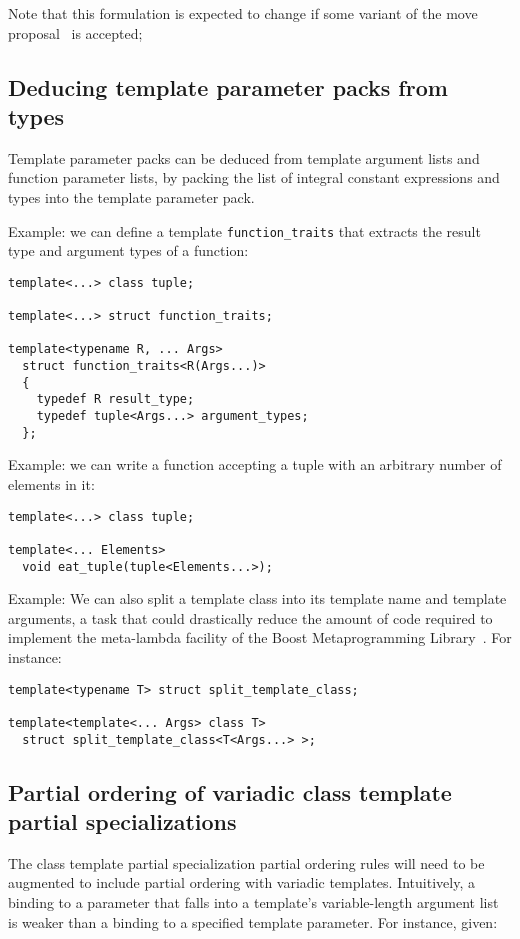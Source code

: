 \documentclass{article}
\begin{document}
Note that this formulation is expected to change if some variant of
the move proposal~\cite{Hinnant02} is accepted;

\subsection{Deducing template parameter packs from types}
Template parameter packs can be deduced from template argument lists
and function parameter lists, by packing the list of integral constant
expressions and types into the template parameter pack.

Example: we can define a template {\tt function\_traits} that extracts
the result type and argument types of a function:
\begin{verbatim}
template<...> class tuple;

template<...> struct function_traits;

template<typename R, ... Args> 
  struct function_traits<R(Args...)>
  { 
    typedef R result_type; 
    typedef tuple<Args...> argument_types;
  };
\end{verbatim}

Example: we can write a function accepting a tuple with an arbitrary
number of elements in it:
\begin{verbatim}
template<...> class tuple;

template<... Elements>
  void eat_tuple(tuple<Elements...>);
\end{verbatim}

Example: We can also split a template class into its template name and
template arguments, a task that could drastically reduce the amount of code required to implement the meta-lambda facility of the Boost Metaprogramming Library~\cite{Gurtovoy02}. For instance:

\begin{verbatim}
template<typename T> struct split_template_class;

template<template<... Args> class T> 
  struct split_template_class<T<Args...> >;
\end{verbatim}

\subsection{Partial ordering of variadic class template partial specializations}
The class template partial specialization partial ordering rules will
need to be augmented to include partial ordering with variadic
templates. Intuitively, a binding to a parameter that falls into a
template's variable-length argument list is weaker than a binding to a
specified template parameter. For instance, given:
\end{document}
